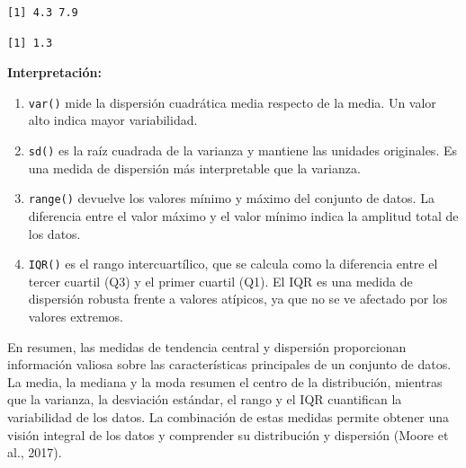 \documentclass[
  spanish,
  a4paper,
  DIV=11,
  numbers=noendperiod,
  onepage,
  openany]{scrreprt}
\newenvironment{Shaded}{\begin{snugshade}}{\end{snugshade}}
\newcommand{\CommentTok}[1]{\textcolor[rgb]{0.37,0.37,0.37}{#1}}
\newcommand{\FunctionTok}[1]{\textcolor[rgb]{0.28,0.35,0.67}{#1}}
\newcommand{\NormalTok}[1]{\textcolor[rgb]{0.00,0.23,0.31}{#1}}
\newcommand{\SpecialCharTok}[1]{\textcolor[rgb]{0.37,0.37,0.37}{#1}}
\begin{document}
\begin{Shaded}
\end{Shaded}

\begin{verbatim}
[1] 4.3 7.9
\end{verbatim}

\begin{Shaded}
\end{Shaded}

\begin{verbatim}
[1] 1.3
\end{verbatim}

\textbf{Interpretación:}

\begin{enumerate}
\def\labelenumi{\arabic{enumi}.}
\item
  \texttt{var()} mide la dispersión cuadrática media respecto de la
  media. Un valor alto indica mayor variabilidad.
\item
  \texttt{sd()} es la raíz cuadrada de la varianza y mantiene las
  unidades originales. Es una medida de dispersión más interpretable que
  la varianza.
\item
  \texttt{range()} devuelve los valores mínimo y máximo del conjunto de
  datos. La diferencia entre el valor máximo y el valor mínimo indica la
  amplitud total de los datos.
\item
  \texttt{IQR()} es el rango intercuartílico, que se calcula como la
  diferencia entre el tercer cuartil (Q3) y el primer cuartil (Q1). El
  IQR es una medida de dispersión robusta frente a valores atípicos, ya
  que no se ve afectado por los valores extremos.
\end{enumerate}

En resumen, las medidas de tendencia central y dispersión proporcionan
información valiosa sobre las características principales de un conjunto
de datos. La media, la mediana y la moda resumen el centro de la
distribución, mientras que la varianza, la desviación estándar, el rango
y el IQR cuantifican la variabilidad de los datos. La combinación de
estas medidas permite obtener una visión integral de los datos y
comprender su distribución y dispersión (Moore et al., 2017).
\end{document}
